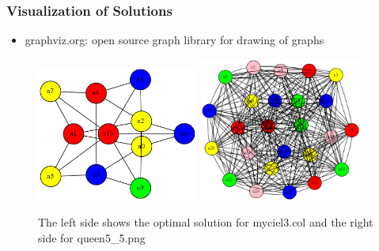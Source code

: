 \documentclass{beamer}
\begin{document}
\begin{frame}
  \frametitle{Visualization of Solutions}

  \begin{itemize}
    \item graphviz.org: open source graph library for drawing of graphs
  \end{itemize}

  \begin{figure}
    \footnotesize
   \includegraphics[width=0.475\textwidth]{myciel3.png}
   \hfill
   \includegraphics[width=0.475\textwidth]{queen5_5.png}
   \caption{The left side shows the optimal solution for myciel3.col and the right side for queen5\_5.png}
   \label{figure1}
\end{figure}

\end{frame}
\end{document}
